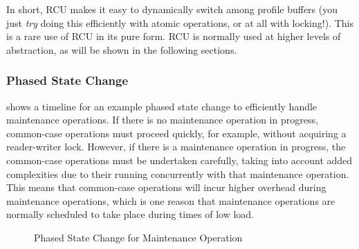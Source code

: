 In short, RCU makes it easy to dynamically switch among profile
buffers (you just \emph{try} doing this efficiently with atomic
operations, or at all with locking!).
This is a rare use of RCU in its pure form.
RCU is normally used at higher levels of abstraction, as
will be shown in the following sections.

\subsubsection{Phased State Change}
\label{sec:defer:Phased State Change}

shows a timeline for an example phased state change to efficiently
handle maintenance operations.
If there is no maintenance operation in progress, common-case operations
must proceed quickly, for example, without acquiring a reader-writer lock.
However, if there is a maintenance operation in progress, the common-case
operations must be undertaken carefully, taking into account added
complexities due to their running concurrently with that maintenance
operation.
This means that common-case operations will incur higher overhead during
maintenance operations, which is one reason that maintenance operations
are normally scheduled to take place during times of low load.

\begin{figure}
\centering
{}
\caption{Phased State Change for Maintenance Operation}
\label{fig:defer:Phased State Change for Maintenance Operation}
\end{figure}

